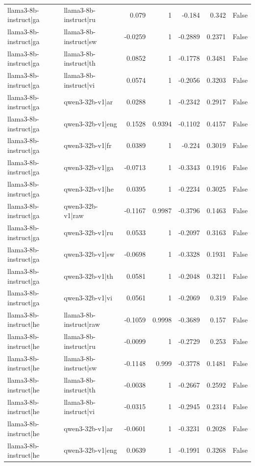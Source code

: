 \begin{table}
\begin{tabular}{l l r r r r l}
llama3-8b-instruct|ga & llama3-8b-instruct|ru & 0.079 & 1 & -0.184 & 0.342 & False \\
llama3-8b-instruct|ga & llama3-8b-instruct|sw & -0.0259 & 1 & -0.2889 & 0.2371 & False \\
llama3-8b-instruct|ga & llama3-8b-instruct|th & 0.0852 & 1 & -0.1778 & 0.3481 & False \\
llama3-8b-instruct|ga & llama3-8b-instruct|vi & 0.0574 & 1 & -0.2056 & 0.3203 & False \\
llama3-8b-instruct|ga & qwen3-32b-v1|ar & 0.0288 & 1 & -0.2342 & 0.2917 & False \\
llama3-8b-instruct|ga & qwen3-32b-v1|eng & 0.1528 & 0.9394 & -0.1102 & 0.4157 & False \\
llama3-8b-instruct|ga & qwen3-32b-v1|fr & 0.0389 & 1 & -0.224 & 0.3019 & False \\
llama3-8b-instruct|ga & qwen3-32b-v1|ga & -0.0713 & 1 & -0.3343 & 0.1916 & False \\
llama3-8b-instruct|ga & qwen3-32b-v1|he & 0.0395 & 1 & -0.2234 & 0.3025 & False \\
llama3-8b-instruct|ga & qwen3-32b-v1|raw & -0.1167 & 0.9987 & -0.3796 & 0.1463 & False \\
llama3-8b-instruct|ga & qwen3-32b-v1|ru & 0.0533 & 1 & -0.2097 & 0.3163 & False \\
llama3-8b-instruct|ga & qwen3-32b-v1|sw & -0.0698 & 1 & -0.3328 & 0.1931 & False \\
llama3-8b-instruct|ga & qwen3-32b-v1|th & 0.0581 & 1 & -0.2048 & 0.3211 & False \\
llama3-8b-instruct|ga & qwen3-32b-v1|vi & 0.0561 & 1 & -0.2069 & 0.319 & False \\
llama3-8b-instruct|he & llama3-8b-instruct|raw & -0.1059 & 0.9998 & -0.3689 & 0.157 & False \\
llama3-8b-instruct|he & llama3-8b-instruct|ru & -0.0099 & 1 & -0.2729 & 0.253 & False \\
llama3-8b-instruct|he & llama3-8b-instruct|sw & -0.1148 & 0.999 & -0.3778 & 0.1481 & False \\
llama3-8b-instruct|he & llama3-8b-instruct|th & -0.0038 & 1 & -0.2667 & 0.2592 & False \\
llama3-8b-instruct|he & llama3-8b-instruct|vi & -0.0315 & 1 & -0.2945 & 0.2314 & False \\
llama3-8b-instruct|he & qwen3-32b-v1|ar & -0.0601 & 1 & -0.3231 & 0.2028 & False \\
llama3-8b-instruct|he & qwen3-32b-v1|eng & 0.0639 & 1 & -0.1991 & 0.3268 & False \\

\end{tabular}
\end{table}

